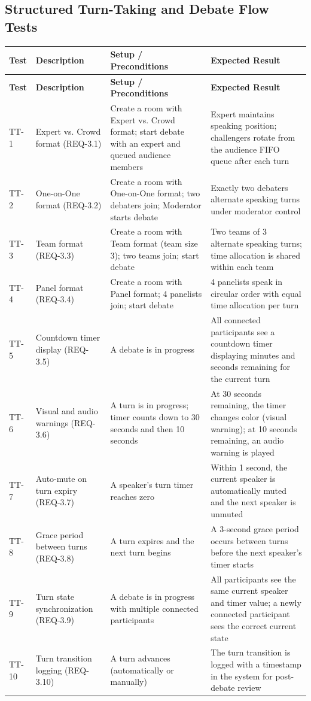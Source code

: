 \documentclass[12pt]{article}
\begin{document}
\subsection{Structured Turn-Taking and Debate Flow Tests}

\begin{longtable}{|p{1.5cm}|p{3cm}|p{4cm}|p{4cm}|}
\hline
\textbf{Test} & \textbf{Description} & \textbf{Setup / Preconditions} & \textbf{Expected Result} \\
\hline
\endfirsthead
\hline
\textbf{Test} & \textbf{Description} & \textbf{Setup / Preconditions} & \textbf{Expected Result} \\
\hline
\endhead
TT-1 & Expert vs. Crowd format (REQ-3.1) & Create a room with Expert vs. Crowd format; start debate with an expert and queued audience members & Expert maintains speaking position; challengers rotate from the audience FIFO queue after each turn \\
\hline
TT-2 & One-on-One format (REQ-3.2) & Create a room with One-on-One format; two debaters join; Moderator starts debate & Exactly two debaters alternate speaking turns under moderator control \\
\hline
TT-3 & Team format (REQ-3.3) & Create a room with Team format (team size 3); two teams join; start debate & Two teams of 3 alternate speaking turns; time allocation is shared within each team \\
\hline
TT-4 & Panel format (REQ-3.4) & Create a room with Panel format; 4 panelists join; start debate & 4 panelists speak in circular order with equal time allocation per turn \\
\hline
TT-5 & Countdown timer display (REQ-3.5) & A debate is in progress & All connected participants see a countdown timer displaying minutes and seconds remaining for the current turn \\
\hline
TT-6 & Visual and audio warnings (REQ-3.6) & A turn is in progress; timer counts down to 30 seconds and then 10 seconds & At 30 seconds remaining, the timer changes color (visual warning); at 10 seconds remaining, an audio warning is played \\
\hline
TT-7 & Auto-mute on turn expiry (REQ-3.7) & A speaker's turn timer reaches zero & Within 1 second, the current speaker is automatically muted and the next speaker is unmuted \\
\hline
TT-8 & Grace period between turns (REQ-3.8) & A turn expires and the next turn begins & A 3-second grace period occurs between turns before the next speaker's timer starts \\
\hline
TT-9 & Turn state synchronization (REQ-3.9) & A debate is in progress with multiple connected participants & All participants see the same current speaker and timer value; a newly connected participant sees the correct current state \\
\hline
TT-10 & Turn transition logging (REQ-3.10) & A turn advances (automatically or manually) & The turn transition is logged with a timestamp in the system for post-debate review \\
\hline
\end{longtable}
\end{document}
